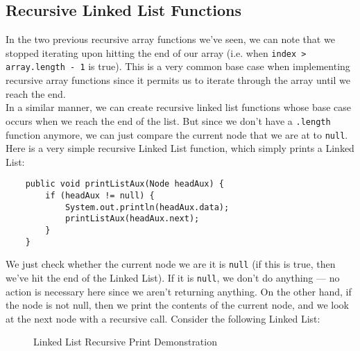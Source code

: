 \subsection{Recursive Linked List Functions}

In the two previous recursive array functions we've seen, we can note that we stopped iterating upon hitting the end of our array (i.e. when \verb!index > array.length - 1! is true). This is a very common base case when implementing recursive array functions since it permits us to iterate through the array until we reach the end. \\

In a similar manner, we can create recursive linked list functions whose base case occurs when we reach the end of the list. But since we don't have a \verb!.length! function anymore, we can just compare the current node that we are at to \verb!null!. \\

\noindent Here is a very simple recursive Linked List function, which simply prints a Linked List:

\begin{lstlisting}
	public void printListAux(Node headAux) {
		if (headAux != null) {
			System.out.println(headAux.data);
			printListAux(headAux.next);
		}
	}
\end{lstlisting}

We just check whether the current node we are it is \verb!null! (if this is true, then we've hit the end of the Linked List). If it is \verb!null!, we don't do anything --- no action is necessary here since we aren't returning anything. On the other hand, if the node is not null, then we print the contents of the current node, and we look at the next node with a recursive call. Consider the following Linked List:

\begin{figure}[h]
\centering
{}
\caption{Linked List Recursive Print Demonstration}
\end{figure}

